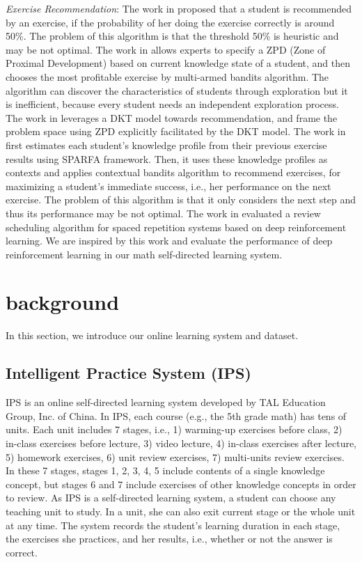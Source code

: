 \documentclass{edm_template}
\begin{document}
\emph{Exercise Recommendation}:
The work in \cite{zpd} proposed that a student is recommended by an exercise, if the probability of her doing the exercise correctly is around 50\%. The problem of this algorithm is that the threshold 50\% is heuristic and may be not optimal.
The work in \cite{mab} allows experts to specify a ZPD (Zone of Proximal Development) based on current knowledge state of a student, and then chooses the most profitable exercise by multi-armed bandits algorithm. The algorithm can discover the characteristics of students through exploration but it is inefficient, because every student needs an independent exploration process.
The work in \cite{goal} leverages a DKT model towards recommendation, and frame the problem space using ZPD explicitly facilitated by the DKT model.
The work in \cite{ucb} first estimates each student's knowledge profile from their previous exercise results using SPARFA framework. Then, it uses these knowledge profiles as contexts and applies contextual bandits algorithm to recommend exercises, for maximizing a student's immediate success, i.e., her performance on the next exercise. The problem of this algorithm is that it only considers the next step and thus its performance may be not optimal.
The work in \cite{acc} evaluated a review scheduling algorithm for spaced repetition systems based on deep reinforcement learning. We are inspired by this work and evaluate the performance of deep reinforcement learning in our math self-directed learning system.

\section{background}
In this section, we introduce our online learning system and dataset.

\subsection{Intelligent Practice System (IPS)}

IPS is an online self-directed learning system developed by TAL Education Group, Inc. of China. In IPS, each course (e.g., the 5th grade math) has tens of units. Each unit includes 7 stages, i.e., 1) warming-up exercises before class, 2) in-class exercises before lecture, 3) video lecture, 4) in-class exercises after lecture, 5) homework exercises, 6) unit review exercises, 7) multi-units review exercises. In these 7 stages, stages 1, 2, 3, 4, 5 include contents of a single knowledge concept, but stages 6 and 7 include exercises of other knowledge concepts in order to review. As IPS is a self-directed learning system, a student can choose any teaching unit to study. In a unit, she can also exit current stage or the whole unit at any time. The system records the student's learning duration in each stage, the exercises she practices, and her results, i.e., whether or not the answer is correct.
\end{document}
